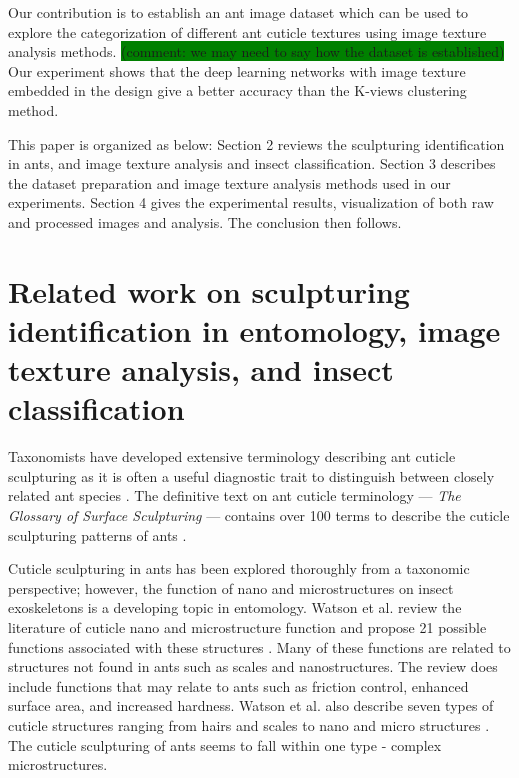 \documentclass{aci}
\numberwithin{equation}{section}
\begin{document}
Our contribution is to establish an ant image dataset which can be used to
explore the categorization of different ant cuticle textures using image texture
analysis methods. \colorbox{green}{(comment: we may need to say how the dataset
    is established)} Our experiment shows that the deep learning networks with image
texture embedded in the design give a better accuracy than the K-views
clustering method.

This paper is organized as below:  Section 2 reviews the sculpturing
identification in ants, and image texture analysis and insect classification.
Section 3 describes the dataset preparation and image texture analysis methods
used in our experiments. Section 4 gives the experimental results, visualization
of both raw and processed images and analysis. The conclusion then follows.

\section{Related work on sculpturing identification in entomology, image texture
  analysis, and insect classification}


Taxonomists have developed extensive terminology describing ant cuticle
sculpturing as it is often a useful diagnostic trait to distinguish between
closely related ant species \cite{blaimer_taxonomy_2019,fisher_ants_2007}. The
definitive text on ant cuticle terminology — \textit{The Glossary of Surface
    Sculpturing} — contains over 100 terms to describe the cuticle sculpturing
patterns of ants \cite{harris_glossary_1979}.

Cuticle sculpturing in ants has been explored thoroughly from a taxonomic
perspective; however, the function of nano and microstructures on insect
exoskeletons is a developing topic in entomology. Watson et al. review the
literature of cuticle nano and microstructure function and propose 21 possible
functions associated with these structures \cite{watson_diversity_2017}. Many of
these functions are related to structures not found in ants such as scales and
nanostructures. The review does include functions that may relate to ants such
as friction control, enhanced surface area, and increased hardness. Watson et
al. also describe seven types of cuticle structures ranging from hairs and
scales to nano and micro structures \cite{watson_diversity_2017}. The cuticle
sculpturing of ants seems to fall within one type - complex microstructures.
\end{document}
